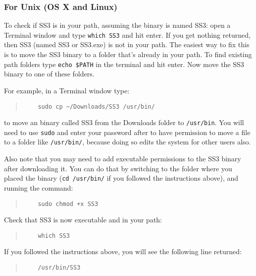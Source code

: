 \subsubsection{For Unix (OS X and Linux)}

To check if SS3 is in your path, assuming the binary is named SS3: open a Terminal window and type \texttt{which SS3} and hit enter. If you get nothing returned, then SS3 (named SS3 or SS3.exe) is not in your path. The easiest way to fix this is to move the SS3 binary to a folder that's already in your path. To find existing path folders type \texttt{echo \$PATH} in the terminal and hit enter. Now move the SS3 binary to one of these folders.

For example, in a Terminal window type:

\begin{quote}
   \begin{verbatim}
    sudo cp ~/Downloads/SS3 /usr/bin/
  \end{verbatim}
\end{quote}

to move an binary called SS3 from the Downloads folder to \texttt{/usr/bin}. You will need to use \texttt{sudo} and enter your password after to have permission to move a file to a folder like \texttt{/usr/bin/}, because doing so edits the system for other users also.

Also note that you may need to add executable permissions to the SS3 binary after downloading it. You can do that by switching to the folder where you placed the binary
(\texttt{cd /usr/bin/} if you followed the instructions above), and running the command:

\begin{quote}
   \begin{verbatim}
    sudo chmod +x SS3
    \end{verbatim}
\end{quote}

Check that SS3 is now executable and in your path:

\begin{quote}
   \begin{verbatim}
    which SS3
    \end{verbatim}
\end{quote}

If you followed the instructions above, you will see the following line returned:

\begin{quote}
   \begin{verbatim}
    /usr/bin/SS3
  \end{verbatim}
\end{quote}

